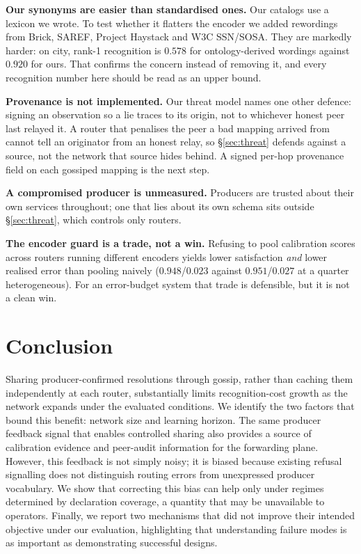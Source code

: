 \documentclass[conference,a4paper]{IEEEtran}
\begin{document}
\textbf{Our synonyms are easier than standardised ones.} Our catalogs use a
lexicon we wrote. To test whether it flatters the encoder we added rewordings
from Brick, SAREF, Project Haystack and W3C SSN/SOSA. They are markedly
harder: on city, rank-1 recognition is $0.578$ for ontology-derived wordings
against $0.920$ for ours. That confirms the concern instead of removing it,
and every recognition number here should be read as an upper bound.

\textbf{Provenance is not implemented.} Our threat model names one other
defence: signing an observation so a lie traces to its origin, not to
whichever honest peer last relayed it. A router that penalises the peer a bad
mapping arrived from cannot tell an originator from an honest relay, so
\S\ref{sec:threat} defends against a source, not the network that source
hides behind. A signed per-hop provenance field on each gossiped mapping is
the next step.

\textbf{A compromised producer is unmeasured.} Producers are trusted about
their own services throughout; one that lies about its own schema sits
outside \S\ref{sec:threat}, which controls only routers.

\textbf{The encoder guard is a trade, not a win.} Refusing to pool
calibration scores across routers running different encoders yields lower
satisfaction \emph{and} lower realised error than pooling naively
($0.948$/$0.023$ against $0.951$/$0.027$ at a quarter heterogeneous). For an
error-budget system that trade is defensible, but it is not a clean win.

\section{Conclusion}
\label{sec:conclusion}

Sharing producer-confirmed resolutions through gossip, rather than caching
them independently at each router, substantially limits recognition-cost
growth as the network expands under the evaluated conditions. We identify the
two factors that bound this benefit: network size and learning horizon. The
same producer feedback signal that enables controlled sharing also provides a
source of calibration evidence and peer-audit information for the forwarding
plane. However, this feedback is not simply noisy; it is biased because
existing refusal signalling does not distinguish routing errors from
unexpressed producer vocabulary. We show that correcting this bias can help
only under regimes determined by declaration coverage, a quantity that may be
unavailable to operators. Finally, we report two mechanisms that did not
improve their intended objective under our evaluation, highlighting that
understanding failure modes is as important as demonstrating successful
designs.



\end{document}
